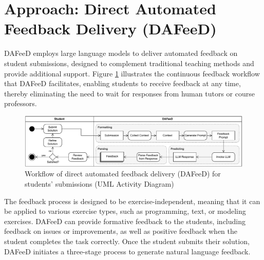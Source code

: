 \documentclass[manuscript,screen,review]{acmart}
\begin{document}




\section{Approach: Direct Automated Feedback Delivery (DAFeeD)} %
\label{sec:approach:DAFeeD}

DAFeeD employs large language models to deliver automated feedback on student submissions, designed to complement traditional teaching methods and provide additional support.
Figure \ref{fig:DAFeeD-workflow} illustrates the continuous feedback workflow that DAFeeD facilitates, enabling students to receive feedback at any time, thereby eliminating the need to wait for responses from human tutors or course professors.

\begin{figure}[htbp]
  \centering
  \includegraphics[width=\linewidth]{figures/DAFeeD-ActivityDiagram_alternative.pdf}
  \caption{Workflow of direct automated feedback delivery (DAFeeD) for students' submissions (UML Activity Diagram)}
  \label{fig:DAFeeD-workflow}
\end{figure}

The feedback process is designed to be exercise-independent, meaning that it can be applied to various exercise types, such as programming, text, or modeling exercises.
DAFeeD can provide formative feedback to the students, including feedback on issues or improvements, as well as positive feedback when the student completes the task correctly.
Once the student submits their solution, DAFeeD initiates a three-stage process to generate natural language feedback.
\end{document}
